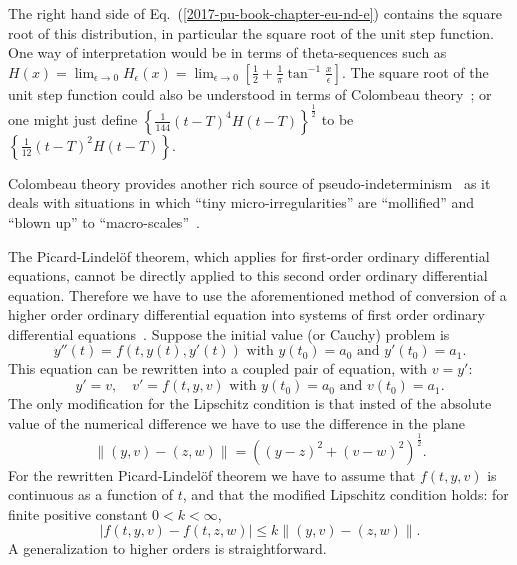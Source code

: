 The right hand side of Eq.~(\ref{2017-pu-book-chapter-eu-nd-e})
contains the square root of this distribution, in particular the square root of the unit step function.
One way of interpretation would be
in terms of theta-sequences such as
$
H (x)= \lim_{\epsilon \rightarrow 0} H_\epsilon (x)=\lim_{\epsilon \rightarrow 0}
\left[ \frac{1 }{2} + \frac{1 }{\pi} \tan^{-1}  \frac{x}{\epsilon } \right]
$.
The square root of the unit step function could also be understood in terms of Colombeau theory~\cite{Colombeau-92};
or
one might just define  $\left\{ \frac{1}{144} (t-T)^4  H (t-T) \right\}^\frac{1}{2}$
to be $\left\{ \frac{1}{12} (t-T)^2  H (t-T) \right\}$.

Colombeau theory provides another rich source of pseudo-indeterminism~\cite{Colombeau1996} as it deals with situations in which ``tiny micro-irregularities''
are ``mollified'' and ``blown up'' to ``macro-scales''~\cite{Balasin-1997,Aichelburg2014}.



The Picard-Lindel\"of theorem, which applies
for first-order ordinary differential equations, cannot be directly applied
to this second order ordinary differential equation.
Therefore we have to use the aforementioned method of conversion of a higher order ordinary differential equation
into systems of first order ordinary differential equations~\cite[Sect.~II.D, pp.~94-96]{Choquet-Bruhat-AMP-P1}.
Suppose the initial value (or Cauchy) problem   is
\begin{equation}
y''(t) = f(t,y(t),y'(t)) \textrm{ with } y(t_0)=a_0 \textrm{ and } y'(t_0)=a_1 .
\end{equation}
This equation can be rewritten into a coupled pair of equation, with $v=y'$:
\begin{equation}
y' = v, \quad
v' = f(t,y,v) \textrm{ with } y(t_0)=a_0 \textrm{ and } v(t_0)=a_1 .
\end{equation}
The only modification for the Lipschitz condition is
that insted of the absolute value of the numerical difference
we have to use the
difference in the plane
\begin{equation}
\|
(y,v) - (z,w)
\|
=
\left(
(y-z)^2 + (v-w)^2
\right)^\frac{1}{2} .
\end{equation}
For the rewritten Picard-Lindel\"of theorem we have to assume
that $f(t,y,v)$ is continuous as a function of $t$,
and that the modified Lipschitz condition holds:
for finite positive constant $0<k<\infty$,
\begin{equation}
\vert f(t,y,v)-f(t,z,w) \vert \le k \|
(y,v) - (z,w)
\|
.
\end{equation}
A generalization to higher orders is straightforward.

